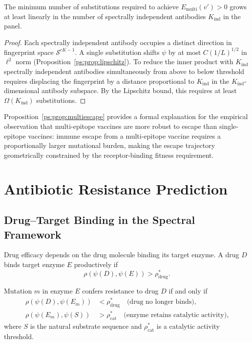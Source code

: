 \begin{proposition}
\label{ps:prop:multiescape}
The minimum number of substitutions required to achieve
$E_{\text{multi}}(v') > 0$ grows at least linearly in the number of spectrally
independent antibodies $K_{\text{ind}}$ in the panel.
\end{proposition}

\begin{proof}
Each spectrally independent antibody occupies a distinct direction in fingerprint
space $\mathcal{S}^{cK-1}$. A single substitution shifts $\psi$ by at most
$C(1/L)^{1/2}$ in $\ell^2$ norm (Proposition~\ref{ps:prop:lipschitz}). To reduce
the inner product with $K_{\text{ind}}$ spectrally independent antibodies
simultaneously from above to below threshold requires displacing the fingerprint
by a distance proportional to $K_{\text{ind}}$ in the $K_{\text{ind}}$-dimensional
antibody subspace. By the Lipschitz bound, this requires at least
$\Omega(K_{\text{ind}})$ substitutions.
\end{proof}

Proposition~\ref{ps:prop:multiescape} provides a formal explanation for the
empirical observation that multi-epitope vaccines are more robust to escape than
single-epitope vaccines: immune escape from a multi-epitope vaccine requires a
proportionally larger mutational burden, making the escape trajectory
geometrically constrained by the receptor-binding fitness requirement.

\section{Antibiotic Resistance Prediction}
\label{ps:sec:resistance}

\subsection{Drug--Target Binding in the Spectral Framework}

Drug efficacy depends on the drug molecule binding its target enzyme. A drug
$D$ binds target enzyme $E$ productively if
\begin{equation}
  \rho(\psi(D), \psi(E)) > \rho^*_{\text{drug}}.
  \label{ps:eq:drug_binding}
\end{equation}

\begin{definition}
\label{ps:def:resistance}
Mutation $m$ in enzyme $E$ confers resistance to drug $D$ if and only if
\begin{align}
  \rho(\psi(D), \psi(E_m)) &< \rho^*_{\text{drug}}
    \quad\text{(drug no longer binds),}
  \label{ps:eq:resist_a} \\
  \rho(\psi(E_m), \psi(S)) &> \rho^*_{\text{cat}}
    \quad\text{(enzyme retains catalytic activity),}
  \label{ps:eq:resist_b}
\end{align}
where $S$ is the natural substrate sequence and $\rho^*_{\text{cat}}$ is a
catalytic activity threshold.
\end{definition}

